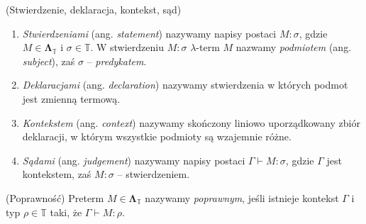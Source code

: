 \begin{definicja}(Stwierdzenie, deklaracja, kontekst, sąd)
  \begin{enumerate}[label=(\arabic*)]
  \setlength\itemsep{0em}
  \item \emph{Stwierdzeniami} (ang. \emph{statement}) nazywamy napisy postaci \(M:\sigma\), gdzie \(M\in\mathbf{\Lambda}_{\mathbb{T}}\) i \(\sigma\in\mathbb{T}\). W stwierdzeniu \(M:\sigma\) \(\lambda\)-term \(M\) nazwamy \emph{podmiotem} (ang. \emph{subject}), zaś \(\sigma\) -- \emph{predykatem}.
  \item \emph{Deklaracjami} (ang. \emph{declaration}) nazywamy stwierdzenia w których podmot jest zmienną termową.
  \item \emph{Kontekstem} (ang. \emph{context}) nazywamy skończony liniowo uporządkowany zbiór deklaracji, w którym wszystkie podmioty są wzajemnie różne.
  \item \emph{Sądami} (ang. \emph{judgement}) nazywamy napisy postaci \(\Gamma\vdash M:\sigma\), gdzie \(\Gamma\) jest kontekstem, zaś \(M:\sigma\) -- stwierdzeniem.  
  \end{enumerate}
\end{definicja}

\begin{definicja}(Poprawność)
  Preterm \(M\in\mathbf{\Lambda}_\mathbb{T}\) nazywamy \emph{poprawnym}, jeśli istnieje kontekst \(\Gamma\) i typ \(\rho\in\mathbb{T}\) taki, że \(\Gamma\vdash M:\rho\).
\end{definicja}
